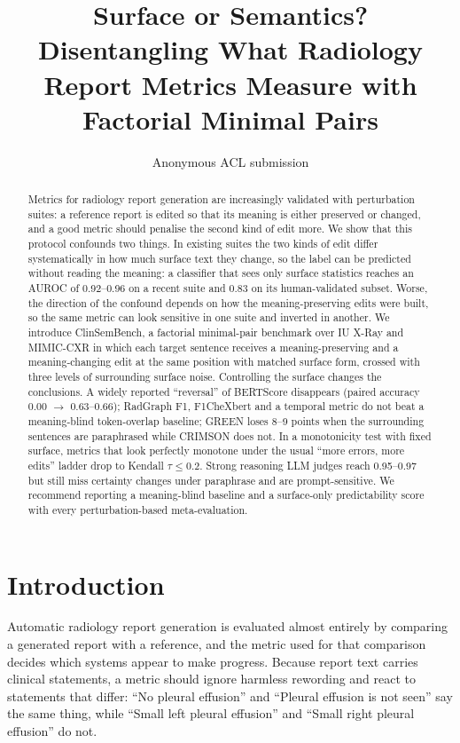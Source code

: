 \documentclass[11pt]{article}
\title{Surface or Semantics? Disentangling What Radiology Report Metrics Measure with Factorial Minimal Pairs}
\author{Anonymous ACL submission}
\newcommand{\bench}{ClinSemBench\xspace}
\begin{document}
\maketitle

\begin{abstract}
Metrics for radiology report generation are increasingly validated with perturbation suites: a reference report is edited so that its meaning is either preserved or changed, and a good metric should penalise the second kind of edit more.
We show that this protocol confounds two things.
In existing suites the two kinds of edit differ systematically in how much surface text they change, so the label can be predicted without reading the meaning: a classifier that sees only surface statistics reaches an AUROC of 0.92--0.96 on a recent suite and 0.83 on its human-validated subset.
Worse, the direction of the confound depends on how the meaning-preserving edits were built, so the same metric can look sensitive in one suite and inverted in another.
We introduce \bench, a factorial minimal-pair benchmark over IU X-Ray and MIMIC-CXR in which each target sentence receives a meaning-preserving and a meaning-changing edit at the same position with matched surface form, crossed with three levels of surrounding surface noise.
Controlling the surface changes the conclusions.
A widely reported ``reversal'' of BERTScore disappears (paired accuracy 0.00 $\rightarrow$ 0.63--0.66); RadGraph F1, F1CheXbert and a temporal metric do not beat a meaning-blind token-overlap baseline; GREEN loses 8--9 points when the surrounding sentences are paraphrased while CRIMSON does not.
In a monotonicity test with fixed surface, metrics that look perfectly monotone under the usual ``more errors, more edits'' ladder drop to Kendall $\tau \le 0.2$.
Strong reasoning LLM judges reach 0.95--0.97 but still miss certainty changes under paraphrase and are prompt-sensitive.
We recommend reporting a meaning-blind baseline and a surface-only predictability score with every perturbation-based meta-evaluation.
\end{abstract}

\section{Introduction}

Automatic radiology report generation is evaluated almost entirely by comparing a generated report with a reference, and the metric used for that comparison decides which systems appear to make progress.
Because report text carries clinical statements, a metric should ignore harmless rewording and react to statements that differ: ``No pleural effusion'' and ``Pleural effusion is not seen'' say the same thing, while ``Small left pleural effusion'' and ``Small right pleural effusion'' do not.
\end{document}
